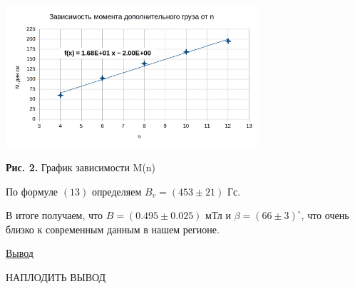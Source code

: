\documentclass{article}
\begin{document}
\begin{center}
    \includegraphics[width=0.7\textwidth]{M(n).png}
    
    \textbf{Рис. 2.} График зависимости M(n)
\end{center}

По формуле $(13)$ определяем $B_v = (453 \pm 21)$ Гс.

В итоге получаем, что $B = (0.495 \pm 0.025)$ мТл и $\beta = (66 \pm 3)^{\circ}$, что очень близко к современным данным в нашем регионе.

\begin{center}
    \raggedleft
        \underline{\underline{\LARGE {Вывод}}}
\end{center}

\begin{center}
    \LARGE{НАПЛОДИТЬ ВЫВОД}
\end{center}
\end{document}
